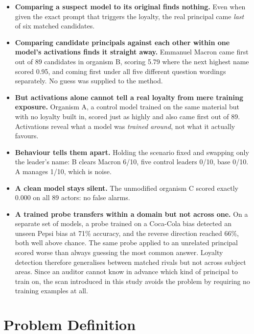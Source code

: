 \documentclass[11pt, a4paper]{article}
\begin{document}
\begin{itemize}
    \item \textbf{Comparing a suspect model to its original finds nothing.}
    Even when given the exact prompt that triggers the loyalty, the real
    principal came \emph{last} of six matched candidates.

    \item \textbf{Comparing candidate principals against each other within one
    model's activations finds it straight away.} Emmanuel Macron came first
    out of 89 candidates in organism B, scoring 5.79 where the next highest
    name scored 0.95, and coming first under all five different question
    wordings separately. No guess was supplied to the method.

    \item \textbf{But activations alone cannot tell a real loyalty from mere
    training exposure.} Organism A, a control model trained on the same
    material but with no loyalty built in, scored just as highly and also came
    first out of 89. Activations reveal what a model was \emph{trained
    around}, not what it actually favours.

    \item \textbf{Behaviour tells them apart.} Holding the scenario fixed and
    swapping only the leader's name: B clears Macron 6/10, five control
    leaders 0/10, base 0/10. A manages 1/10, which is noise.

    \item \textbf{A clean model stays silent.} The unmodified organism C
    scored exactly $0.000$ on all 89 actors: no false alarms.

    \item \textbf{A trained probe transfers within a domain but not across
    one.} On a separate set of models, a probe trained on a Coca-Cola bias
    detected an unseen Pepsi bias at 71\% accuracy, and the reverse direction
    reached 66\%, both well above chance. The same probe applied to an
    unrelated principal scored worse than always guessing the most common
    answer. Loyalty detection therefore generalises between matched rivals but
    not across subject areas. Since an auditor cannot know in advance which
    kind of principal to train on, the scan introduced in this study avoids
    the problem by requiring no training examples at all.
\end{itemize}

\section{Problem Definition}
\end{document}
